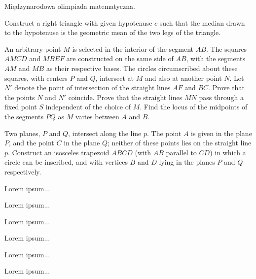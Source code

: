 Międzynarodowa olimpiada matematyczna.

\begin{exercise}[4/1959]
    Construct a right triangle with given hypotenuse $c$ such that the median drawn to the hypotenuse is the geometric mean of the two legs of the triangle.
\end{exercise}

\begin{exercise}[5/1959]
    An arbitrary point $M$ is selected in the interior of the segment $AB$.
    The squares $AMCD$ and $MBEF$ are constructed on the same side of $AB$, with the segments $AM$ and $MB$ as their respective bases.
    The circles circumscribed about these squares, with centers $P$ and $Q$, intersect at $M$ and also at another point $N$.
    Let $N'$ denote the point of intersection of the straight lines $AF$ and $BC$.
    Prove that the points $N$ and $N'$ coincide.
    Prove that the straight lines $MN$ pass through a fixed point $S$ independent of the choice of $M$.
    Find the locus of the midpoints of the segments $PQ$ as $M$ varies between $A$ and $B$.
\end{exercise}

\begin{exercise}[6/1959]
    Two planes, $P$ and $Q$, intersect along the line $p$.
    The point $A$ is given in the plane $P$, and the point $C$ in the plane $Q$;
    neither of these points lies on the straight line $p$.
    Construct an isosceles trapezoid $ABCD$ (with $AB$ parallel to $CD$) in which a circle can be inscribed, and with vertices $B$ and $D$ lying in the planes $P$ and $Q$ respectively.
\end{exercise}

\begin{exercise}[1/1960] Lorem ipsum... \end{exercise}
\begin{exercise}[2/1960] Lorem ipsum... \end{exercise}
\begin{exercise}[3/1960] Lorem ipsum... \end{exercise}
\begin{exercise}[4/1960] Lorem ipsum... \end{exercise}
\begin{exercise}[5/1960] Lorem ipsum... \end{exercise}
\begin{exercise}[6/1960] Lorem ipsum... \end{exercise}

